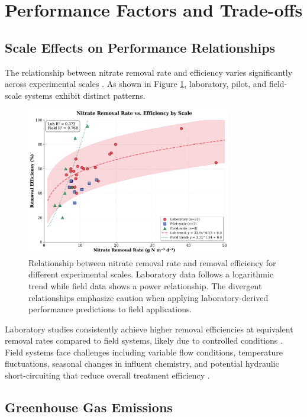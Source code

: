 \documentclass[12pt,a4paper]{article}
\begin{document}
\section{Performance Factors and Trade-offs}

\subsection{Scale Effects on Performance Relationships}

The relationship between nitrate removal rate and efficiency varies significantly across experimental scales \citep{RN312, RN310}. As shown in Figure \ref{fig:rate_vs_efficiency}, laboratory, pilot, and field-scale systems exhibit distinct patterns.

\begin{figure}[ht]
\centering
\includegraphics[width=0.8\textwidth]{fig2_rate_efficiency_scientific}
\caption{Relationship between nitrate removal rate and removal efficiency for different experimental scales. Laboratory data follows a logarithmic trend while field data shows a power relationship. The divergent relationships emphasize caution when applying laboratory-derived performance predictions to field applications.}
\label{fig:rate_vs_efficiency}
\end{figure}

Laboratory studies consistently achieve higher removal efficiencies at equivalent removal rates compared to field systems, likely due to controlled conditions \citep{new_ref_4}. Field systems face challenges including variable flow conditions, temperature fluctuations, seasonal changes in influent chemistry, and potential hydraulic short-circuiting that reduce overall treatment efficiency \citep{RN312, RN309}.

\subsection{Greenhouse Gas Emissions}
\end{document}
